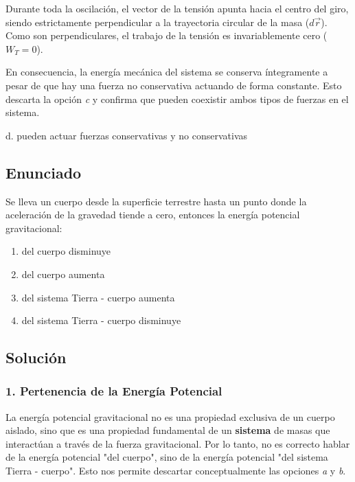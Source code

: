 \documentclass[12pt, a4paper]{article}
\begin{document}
Durante toda la oscilación, el vector de la tensión apunta hacia el centro del giro, siendo estrictamente perpendicular a la trayectoria circular de la masa ($d\vec{r}$). Como son perpendiculares, el trabajo de la tensión es invariablemente cero ($W_T = 0$). 

En consecuencia, la energía mecánica del sistema se conserva íntegramente a pesar de que hay una fuerza no conservativa actuando de forma constante. Esto descarta la opción \textit{c} y confirma que pueden coexistir ambos tipos de fuerzas en el sistema.

\begin{tcolorbox}[colback=green!5!white, colframe=green!50!black, title=Respuesta Correcta]
\centering \Large d. pueden actuar fuerzas conservativas y no conservativas
\end{tcolorbox}

\newpage

\subsection*{Enunciado}
Se lleva un cuerpo desde la superficie terrestre hasta un punto donde la aceleración de la gravedad tiende a cero, entonces la energía potencial gravitacional:
\begin{enumerate}[label=\alph*.]
    \item del cuerpo disminuye
    \item del cuerpo aumenta
    \item del sistema Tierra - cuerpo aumenta
    \item del sistema Tierra - cuerpo disminuye
\end{enumerate}

\subsection*{Solución}

\subsubsection*{1. Pertenencia de la Energía Potencial}
La energía potencial gravitacional no es una propiedad exclusiva de un cuerpo aislado, sino que es una propiedad fundamental de un \textbf{sistema} de masas que interactúan a través de la fuerza gravitacional. Por lo tanto, no es correcto hablar de la energía potencial "del cuerpo", sino de la energía potencial "del sistema Tierra - cuerpo". Esto nos permite descartar conceptualmente las opciones \textit{a} y \textit{b}.
\end{document}
